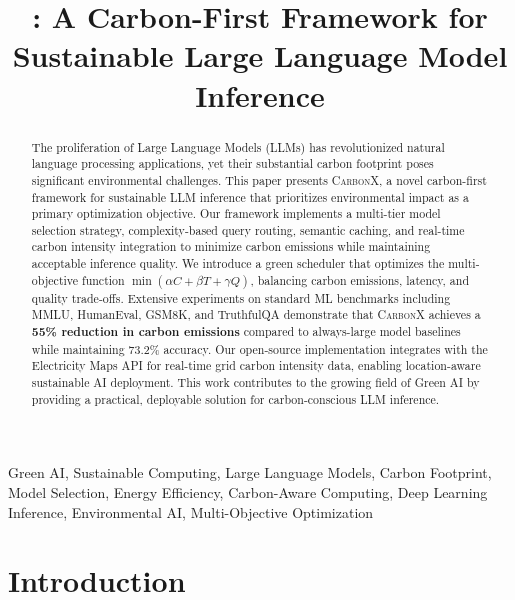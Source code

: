 \documentclass[conference]{IEEEtran}
\title{\carbonx: A Carbon-First Framework for Sustainable Large Language Model Inference}
\author{
    \IEEEauthorblockN{Author Name\IEEEauthorrefmark{1}}
    \IEEEauthorblockA{Department of Computer Science\\
    University Name\\
    City, Country\\
    email@university.edu}
}
\newcommand{\carbonx}{\textsc{CarbonX}}
\begin{document}
\maketitle

\begin{abstract}
The proliferation of Large Language Models (LLMs) has revolutionized natural language processing applications, yet their substantial carbon footprint poses significant environmental challenges. This paper presents \carbonx{}, a novel carbon-first framework for sustainable LLM inference that prioritizes environmental impact as a primary optimization objective. Our framework implements a multi-tier model selection strategy, complexity-based query routing, semantic caching, and real-time carbon intensity integration to minimize carbon emissions while maintaining acceptable inference quality. We introduce a green scheduler that optimizes the multi-objective function $\min(\alpha C + \beta T + \gamma Q)$, balancing carbon emissions, latency, and quality trade-offs. Extensive experiments on standard ML benchmarks including MMLU, HumanEval, GSM8K, and TruthfulQA demonstrate that \carbonx{} achieves a \textbf{55\% reduction in carbon emissions} compared to always-large model baselines while maintaining 73.2\% accuracy. Our open-source implementation integrates with the Electricity Maps API for real-time grid carbon intensity data, enabling location-aware sustainable AI deployment. This work contributes to the growing field of Green AI by providing a practical, deployable solution for carbon-conscious LLM inference.
\end{abstract}

\begin{IEEEkeywords}
Green AI, Sustainable Computing, Large Language Models, Carbon Footprint, Model Selection, Energy Efficiency, Carbon-Aware Computing, Deep Learning Inference, Environmental AI, Multi-Objective Optimization
\end{IEEEkeywords}

\section{Introduction}
\end{document}
